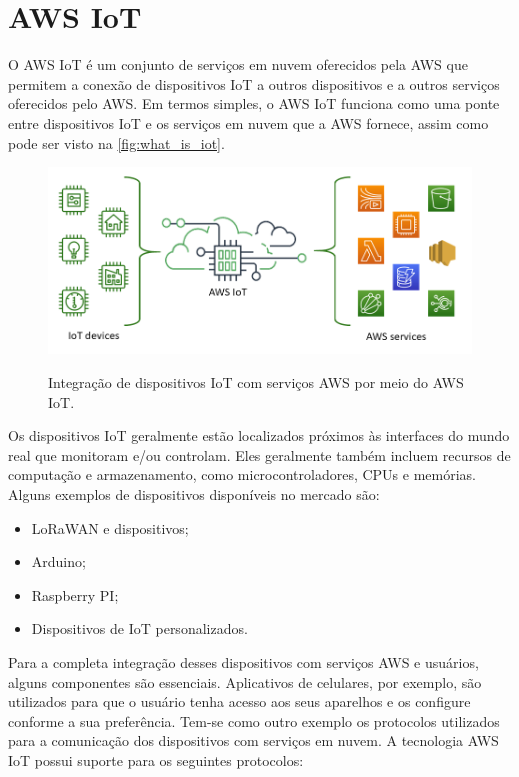\section{AWS IoT}\label{section:aws_iot}

O AWS IoT é um conjunto de serviços em nuvem oferecidos pela AWS que permitem a conexão de dispositivos IoT a outros dispositivos e a outros serviços oferecidos pelo AWS. Em termos simples, o AWS IoT funciona como uma ponte entre dispositivos IoT e os serviços em nuvem que a AWS fornece, assim como pode ser visto na \autoref{fig:what_is_iot}.

\begin{figure}[htbp]
	\centering
	\caption{Integração de dispositivos IoT com serviços AWS por meio do AWS IoT.}
	\includegraphics[scale=0.5]{Imagens/what-is-aws-iot.png}
	\label{fig:what_is_iot}
\end{figure}

Os dispositivos IoT geralmente estão localizados próximos às interfaces do mundo real que monitoram e/ou controlam. Eles geralmente também incluem recursos de computação e armazenamento, como microcontroladores, CPUs e memórias. Alguns exemplos de dispositivos disponíveis no mercado são:

\begin{itemize}
	\item LoRaWAN e dispositivos;
	\item Arduino;
	\item Raspberry PI;
	\item Dispositivos de IoT personalizados.
\end{itemize}

Para a completa integração desses dispositivos com serviços AWS e usuários, alguns componentes são essenciais. Aplicativos de celulares, por exemplo, são utilizados para que o usuário tenha acesso aos seus aparelhos e os configure conforme a sua preferência. Tem-se como outro exemplo os protocolos utilizados para a comunicação dos dispositivos com serviços em nuvem. A tecnologia AWS IoT possui suporte para os seguintes protocolos:

